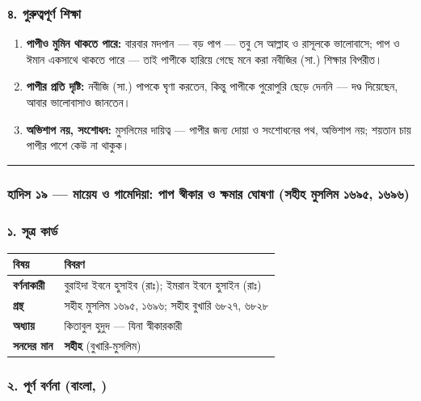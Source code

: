 \subsubsection*{৪. গুরুত্বপূর্ণ শিক্ষা}

\begin{enumerate}
\item \textbf{পাপীও মুমিন থাকতে পারে:} বারবার মদপান — বড় পাপ — তবু সে আল্লাহ ও রাসূলকে ভালোবাসে; পাপ ও ঈমান একসাথে থাকতে পারে — তাই পাপীকে হারিয়ে গেছে মনে করা নবীজির (সা.) শিক্ষার বিপরীত।
\item \textbf{পাপীর প্রতি দৃষ্টি:} নবীজি (সা.) পাপকে ঘৃণা করতেন, কিন্তু পাপীকে পুরোপুরি ছেড়ে দেননি — দণ্ড দিয়েছেন, আবার ভালোবাসাও জানতেন।
\item \textbf{অভিশাপ নয়, সংশোধন:} মুসলিমের দায়িত্ব — পাপীর জন্য দোয়া ও সংশোধনের পথ, অভিশাপ নয়; শয়তান চায় পাপীর পাশে কেউ না থাকুক।
\end{enumerate}
\medskip\hrule\medskip

\subsubsection*{হাদিস ১৯ — মায়েয ও গামেদিয়া: পাপ স্বীকার ও ক্ষমার ঘোষণা (সহীহ মুসলিম ১৬৯৫, ১৬৯৬)}

\subsubsection*{১. সূত্র কার্ড}

\begin{table}[h]\centering\small
\begin{tabular}{ll}
বিষয় & বিবরণ \\
\hline
\textbf{বর্ণনাকারী} & বুরাইদা ইবনে হুসাইব (রাঃ); ইমরান ইবনে হুসাইন (রাঃ) \\
\textbf{গ্রন্থ} & সহীহ মুসলিম ১৬৯৫, ১৬৯৬; সহীহ বুখারি ৬৮২৭, ৬৮২৮ \\
\textbf{অধ্যায়} & কিতাবুল হুদুদ — যিনা স্বীকারকারী \\
\textbf{সনদের মান} & \textbf{সহীহ} (বুখারি-মুসলিম) \\
\hline
\end{tabular}
\end{table}

\subsubsection*{২. পূর্ণ বর্ণনা (বাংলা, )}

